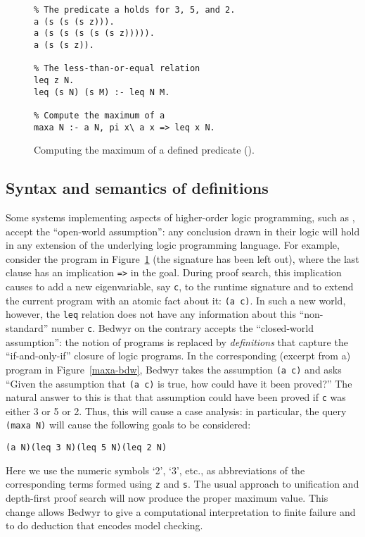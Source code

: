 \begin{figure}
\begin{verbatim}
% The predicate a holds for 3, 5, and 2.
a (s (s (s z))).
a (s (s (s (s (s z))))).
a (s (s z)).

% The less-than-or-equal relation
leq z N.
leq (s N) (s M) :- leq N M.

% Compute the maximum of a
maxa N :- a N, pi x\ a x => leq x N.
\end{verbatim}
\caption{Computing the maximum of a defined predicate (\lp).}
\label{maxa-lp}
\end{figure}

\subsection{Syntax and semantics of definitions}

Some systems implementing aspects of higher-order logic programming,
such as \lp{}, accept the ``open-world assumption'': any conclusion
drawn in their logic will hold in any extension of the underlying logic
programming language.
For example, consider the \lp{} program in Figure~\ref{maxa-lp} (the
signature has been left out), where the last clause has an implication
\verb.=>. in the goal. During proof search, this implication
causes \lp{} to add a new eigenvariable, say \verb.c., to the runtime
signature
and to extend the current program with an atomic fact about it:
\verb.(a c).. In such a new world, however, the {\tt leq} relation
does not have any information about this ``non-standard'' number
{\tt c}.
Bedwyr on the contrary accepts the ``closed-world assumption'': the
notion of programs is replaced by {\em definitions} that capture the
``if-and-only-if'' closure of logic programs. In the corresponding
(excerpt from a) program in Figure~\ref{maxa-bdw}, Bedwyr takes the
assumption \verb.(a c). and asks ``Given the assumption that
\verb.(a c). is true, how could have it been proved?'' The natural
answer to this is that that assumption could have been proved if
\verb.c. was either 3 or 5 or 2. Thus, this will cause a case analysis:
in particular, the query \verb.(maxa N). will cause the following goals
to be considered:
\begin{center}
  \tt(a N)\qquad(leq 3 N)\qquad(leq 5 N)\qquad(leq 2 N)
\end{center}
Here we use the numeric symbols `2', `3', etc., as abbreviations of the
corresponding terms formed using \texttt{z} and \texttt{s}. The usual
approach to unification and depth-first proof search will now produce
the proper maximum value. This change allows Bedwyr to give a
computational interpretation to finite failure and to do deduction that
encodes model checking.

